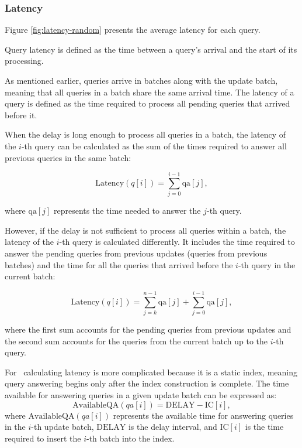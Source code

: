\subsubsection{Latency}

Figure \ref{fig:latency-random} presents the average latency for each query. 

\begin{definition}
Query latency is defined as the time between a query's arrival and the start of its processing.
\end{definition}

As mentioned earlier, queries arrive in batches along with the update batch, meaning 
that all queries in a batch share the same arrival time. The latency of a query is 
defined as the time required to process all pending queries that arrived before it.

When the delay is long enough to process all queries in a batch, the latency of the 
$i$-th query can be calculated as the sum of the times required to answer all previous 
queries in the same batch:

\[
\text{Latency}(q[i]) = \sum_{j=0}^{i-1} \text{qa}[j],
\]

where $\text{qa}[j]$ represents the time needed to answer the $j$-th query.

However, if the delay is not sufficient to process all queries within a batch, 
the latency of the $i$-th query is calculated differently. It includes the time 
required to answer the pending queries from previous updates (queries from previous batches) 
and the time for all the queries that arrived before the $i$-th query in the current batch:

\[
\text{Latency}(q[i]) = \sum_{j=k}^{n-1} \text{qa}[j] + \sum_{j=0}^{i-1} \text{qa}[j],
\]

where the first sum accounts for the pending queries from previous updates
and the second sum accounts for the queries from the current batch up to the $i$-th query.

For \Fresh\, calculating latency is more complicated because it is a static index, meaning 
query answering begins only after the index construction is complete. The time available 
for answering queries in a given update batch can be expressed as:
\[
\text{AvailableQA}(qa[i]) = \text{DELAY} - \text{IC}[i],
\]
where $\text{AvailableQA}(qa[i])$ represents the available time for answering queries 
in the $i$-th update batch, $\text{DELAY}$ is the delay interval, and $\text{IC}[i]$ 
is the time required to insert the $i$-th batch into the index.

